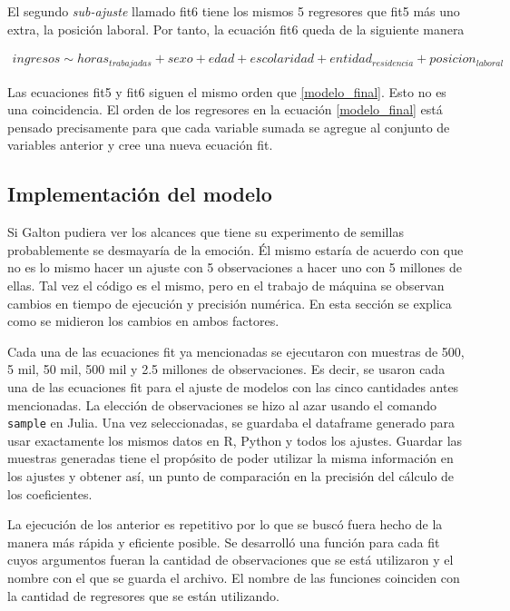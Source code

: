 El segundo \textit{sub-ajuste} llamado \textsf{fit6} tiene los mismos 5 regresores que \textsf{fit5} más uno extra, la posición laboral. Por tanto, la ecuación \textsf{fit6} queda de la siguiente manera

\begin{equation*}
    \begin{aligned}
    ingresos \sim horas_{trabajadas} + sexo + edad + escolaridad + entidad_{residencia} + posicion_{laboral}
    \end{aligned}
\end{equation*}

Las ecuaciones \textsf{fit5} y \textsf{fit6} siguen el mismo orden que \ref{modelo_final}. Esto no es una coincidencia. El orden de los regresores en la ecuación \ref{modelo_final} está pensado precisamente para que cada variable sumada se agregue al conjunto de variables anterior y cree una nueva ecuación \textsf{fit}.

\subsection{Implementación del modelo}

Si Galton pudiera ver los alcances que tiene su experimento de semillas probablemente se desmayaría de la emoción. Él mismo estaría de acuerdo con que no es lo mismo hacer un ajuste con 5 observaciones a hacer uno con 5 millones de ellas. Tal vez el código es el mismo, pero en el trabajo de máquina se observan cambios en tiempo de ejecución y precisión numérica. En esta sección se explica como se midieron los cambios en ambos factores. 

Cada una de las ecuaciones \textsf{fit} ya mencionadas se ejecutaron con muestras de 500, 5 mil, 50 mil, 500 mil y 2.5 millones de observaciones. Es decir, se usaron cada una de las ecuaciones \textsf{fit} para el ajuste de modelos con las cinco cantidades antes mencionadas. La elección de observaciones se hizo al azar usando el comando \texttt{sample} en \textsf{Julia}. Una vez seleccionadas, se guardaba el dataframe generado para usar exactamente los mismos datos en \textsf{R}, \textsf{Python} y todos los ajustes. Guardar las muestras generadas tiene el propósito de poder utilizar la misma información en los ajustes y obtener así, un punto de comparación en la precisión del cálculo de los coeficientes. 

La ejecución de los anterior es repetitivo por lo que se buscó fuera hecho de la manera más rápida y eficiente posible. Se desarrolló una función para cada \textsf{fit} cuyos argumentos fueran la cantidad de observaciones que se está utilizaron y el nombre con el que se guarda el archivo. El nombre de las funciones coinciden con la cantidad de regresores que se están utilizando. 

